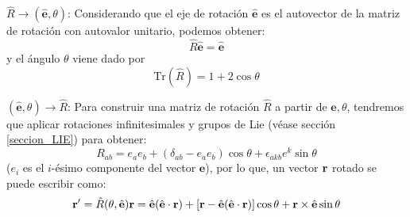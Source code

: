 \documentclass[]{article}
\numberwithin{equation}{section}
\begin{document}
\begin{figure}[h!]
\end{figure}

\(\hat{R} \rightarrow (\hat{\mathbf{e}},\theta)\): Considerando que el eje de rotación \(\hat{\mathbf{e}}\) es el autovector de la matriz de rotación con autovalor unitario, podemos obtener:
\begin{equation}
	\hat{R}\hat{\mathbf{e}} = \hat{\mathbf{e}}
\end{equation}
y el ángulo $\theta$ viene dado por
\begin{equation}
	\mathrm{Tr}(\hat{R}) = 1 + 2\cos\theta
\end{equation}

\((\hat{\mathbf{e}},\theta) \rightarrow \hat{R}\):  Para construir una matriz de rotación \(\hat{R}\) a partir de \(\hat{\mathbf{e}},\theta\), tendremos que aplicar rotaciones infinitesimales y grupos de Lie (véase sección \ref{seccion_LIE}) para obtener:
\begin{equation}
	R_{ab} = e_{a} e_{b} + (\delta_{ab} - e_{a} e_{b})\cos\theta + \epsilon_{akb} e^{k} \sin\theta
\end{equation}
(\(e_{i}\) es el \(i\)-ésimo componente del vector \(\mathbf{e}\)), por lo que, un vector \(\mathbf{r}\) rotado se puede escribir como:
\begin{equation}
	\mathbf{r}' = \hat{R}(\theta,\hat{\mathbf{e}})\mathbf{r} = \hat{\mathbf{e}}(\hat{\mathbf{e}}\cdot\mathbf{r}) + \left[\mathbf{r} - \hat{\mathbf{e}}(\hat{\mathbf{e}}\cdot\mathbf{r})\right]\cos\theta + \mathbf{r}\times\hat{\mathbf{e}}\sin\theta
\end{equation}
\end{document}
